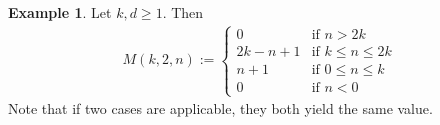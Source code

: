 \documentclass{scrartcl}
\theoremstyle{definition}
\newtheorem{example}[definition]{Example}
\begin{document}
\begin{example}
    Let $k, d \geq 1$. Then
    \begin{align*}
        M(k, 2, n) := \begin{cases}
            0 & \text{if $n > 2k$} \\
            2k - n + 1 & \text{if $k \leq n \leq 2k$} \\
            n + 1 & \text{if $0 \leq n \leq k$} \\
            0 & \text{if $n < 0$}
        \end{cases}
    \end{align*}
    Note that if two cases are applicable, they both yield the same value.
\end{example}
\end{document}
